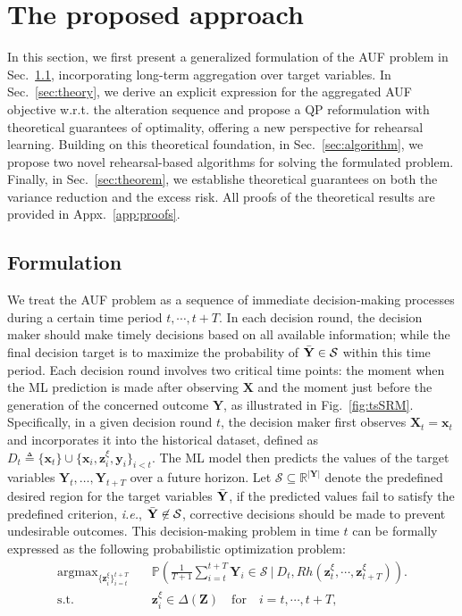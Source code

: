 \documentclass{article}
\theoremstyle{plain}
\theoremstyle{definition}
\theoremstyle{remark}
\def \ie {\textit{i.e.}}
\def \Fig {Fig.}
\def \Sec {Sec.}
\def \x {\mathbf{x}}
\def \Z {\mathbf{Z}}
\def \sS {\mathcal{S}}
\def \X {\mathbf{X}}
\def \Y {\mathbf{Y}}
\def \y {\mathbf{y}}
\def \z {\mathbf{z}}
\begin{document}
\section{The proposed approach}
\label{sec:proposed}

In this section, we first present a generalized formulation of the AUF problem in \Sec~\ref{sec:problem_setup}, incorporating long-term aggregation over target variables. 
In \Sec~\ref{sec:theory}, we derive an explicit expression for the aggregated AUF objective w.r.t. the alteration sequence and propose a QP reformulation with theoretical guarantees of optimality, offering a new perspective for rehearsal learning. 
Building on this theoretical foundation, in \Sec~\ref{sec:algorithm}, we propose two novel rehearsal-based algorithms for solving the formulated problem. 
Finally, in \Sec~\ref{sec:theorem}, we establishe theoretical guarantees on both the variance reduction and the excess risk. 
All proofs of the theoretical results are provided in Appx.~\ref{app:proofs}.


\subsection{Formulation}
\label{sec:problem_setup}
We treat the AUF problem as a sequence of immediate decision-making processes during a certain time period \(t,\cdots,t+T\). In each decision round, the decision maker should make timely decisions based on all available information; while the final decision target is to maximize the probability of \(\Bar{\Y}\in\sS\) within this time period. 
Each decision round involves two critical time points: the moment when the ML prediction is made after observing \(\X\) and the moment just before the generation of the concerned outcome \(\Y\), as illustrated in \Fig~\ref{fig:tsSRM}.  
Specifically, in a given decision round \(t\), the decision maker first observes \(\X_t = \x_t\) and incorporates it into the historical dataset, defined as \(D_t \triangleq \{\x_t\} \cup \{\x_i, \z_i^\xi, \y_i\}_{i<t}\).  
The ML model then predicts the values of the target variables \(\Y_t, \dots, \Y_{t+T}\) over a future horizon. 
Let \(\sS \subseteq \mathbb{R}^{|\Y|}\) denote the predefined desired region for the target variables \(\Bar{\Y}\), 
if the predicted values fail to satisfy the predefined criterion, \ie, \(\Bar{\Y} \not\in\sS\), corrective decisions should be made to prevent undesirable outcomes. 
This decision-making problem in time \(t\) can be formally expressed as the following probabilistic optimization problem: 
\begin{equation}
  \label{eq:cs_auf}
    \begin{aligned}
      \mathop{\arg\max}_{\{\z^\xi_{i}\}_{i=t}^{t+T}}\quad & \mathbb{P}\left(\frac{1}{T+1}\sum_{i=t}^{t+T}\Y_{i} \in\sS\ \Big| \ D_t, Rh(\z^\xi_t,\cdots, \z^\xi_{t+T})\right).\\
      \operatorname*{s.t.}\quad &  \z^\xi_i\in\Delta(\Z)\quad\text{for}\quad i = t, \cdots, t+T,
    \end{aligned}   
\end{equation}
\vskip -0.05in
\end{document}
